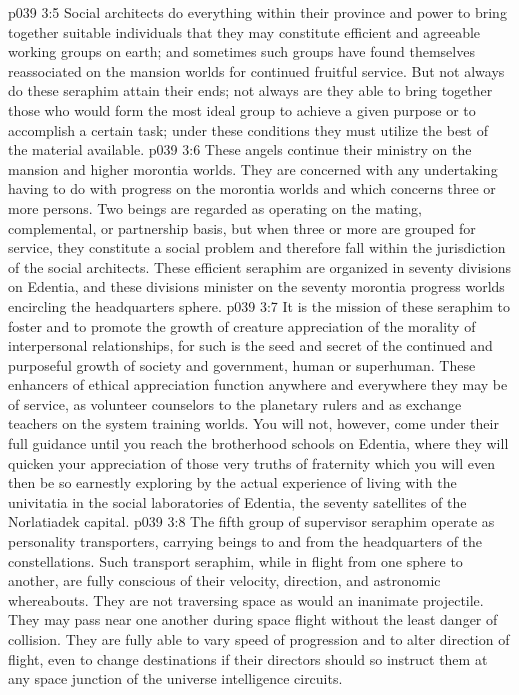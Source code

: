 \vs p039 3:5 Social architects do everything within their province and power to bring together suitable individuals that they may constitute efficient and agreeable working groups on earth; and sometimes such groups have found themselves reassociated on the mansion worlds for continued fruitful service. But not always do these seraphim attain their ends; not always are they able to bring together those who would form the most ideal group to achieve a given purpose or to accomplish a certain task; under these conditions they must utilize the best of the material available.
\vs p039 3:6 These angels continue their ministry on the mansion and higher morontia worlds. They are concerned with any undertaking having to do with progress on the morontia worlds and which concerns three or more persons. Two beings are regarded as operating on the mating, complemental, or partnership basis, but when three or more are grouped for service, they constitute a social problem and therefore fall within the jurisdiction of the social architects. These efficient seraphim are organized in seventy divisions on Edentia, and these divisions minister on the seventy morontia progress worlds encircling the headquarters sphere.
\pc \vs p039 3:7 \bibnobreakspace {} It is the mission of these seraphim to foster and to promote the growth of creature appreciation of the morality of interpersonal relationships, for such is the seed and secret of the continued and purposeful growth of society and government, human or superhuman. These enhancers of ethical appreciation function anywhere and everywhere they may be of service, as volunteer counselors to the planetary rulers and as exchange teachers on the system training worlds. You will not, however, come under their full guidance until you reach the brotherhood schools on Edentia, where they will quicken your appreciation of those very truths of fraternity which you will even then be so earnestly exploring by the actual experience of living with the univitatia in the social laboratories of Edentia, the seventy satellites of the Norlatiadek capital.
\pc \vs p039 3:8 \bibnobreakspace {} The fifth group of supervisor seraphim operate as personality transporters, carrying beings to and from the headquarters of the constellations. Such transport seraphim, while in flight from one sphere to another, are fully conscious of their velocity, direction, and astronomic whereabouts. They are not traversing space as would an inanimate projectile. They may pass near one another during space flight without the least danger of collision. They are fully able to vary speed of progression and to alter direction of flight, even to change destinations if their directors should so instruct them at any space junction of the universe intelligence circuits.
